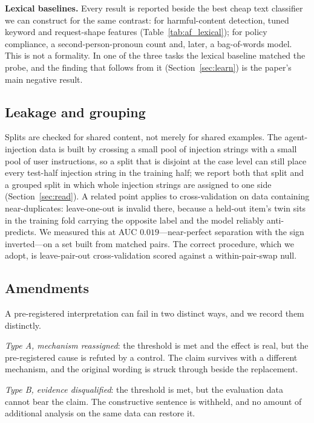 \textbf{Lexical baselines.} Every result is reported beside the best cheap text classifier we can construct for the
same contrast: for harmful-content detection, tuned keyword and request-shape features (Table~\ref{tab:af_lexical});
for policy compliance, a second-person-pronoun count and, later, a bag-of-words model. This is not a formality. In one
of the three tasks the lexical baseline matched the probe, and the finding that follows from it
(Section~\ref{sec:learn}) is the paper's main negative result.

\subsection{Leakage and grouping}
\label{sec:leakage}

Splits are checked for shared content, not merely for shared examples. The agent-injection data is built by crossing a
small pool of injection strings with a small pool of user instructions, so a split that is disjoint at the case level
can still place every test-half injection string in the training half; we report both that split and a grouped split
in which whole injection strings are assigned to one side (Section~\ref{sec:read}). A related point applies to
cross-validation on data containing near-duplicates: leave-one-out is invalid there, because a held-out item's twin
sits in the training fold carrying the opposite label and the model reliably anti-predicts. We measured this at AUC
$0.019$---near-perfect separation with the sign inverted---on a set built from matched pairs. The correct procedure,
which we adopt, is leave-pair-out cross-validation scored against a within-pair-swap null.

\subsection{Amendments}
\label{sec:amendments}

A pre-registered interpretation can fail in two distinct ways, and we record them distinctly.

\emph{Type A, mechanism reassigned}: the threshold is met and the effect is real, but the pre-registered cause is
refuted by a control. The claim survives with a different mechanism, and the original wording is struck through beside
the replacement.

\emph{Type B, evidence disqualified}: the threshold is met, but the evaluation data cannot bear the claim. The
constructive sentence is withheld, and no amount of additional analysis on the same data can restore it.

